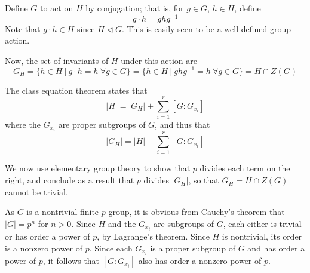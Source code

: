 \documentclass[12pt]{article}
\begin{document}
Define $G$ to act on $H$ by conjugation; that is, for $g\in G$, $h\in H$, define
\[g \cdot h = ghg^{-1}\]
Note that $g\cdot h\in H$ since $H\triangleleft G$. This is easily seen to be a well-defined group action.

Now, the set of invariants of $H$ under this action are
\[G_H=\{h \in H \  \lvert \  g \cdot h = h \  \forall g\in G\} = \{h \in H \  \lvert \  ghg^{-1} = h \  \forall g\in G\}=H \cap Z(G)\]

The class equation theorem states that
\[\lvert H\rvert = \lvert G_H\rvert + \sum_{i=1}^{r}[G:G_{x_{i}}]\]
where the $G_{x_{i}}$ are proper subgroups of $G$, and thus that
\[\lvert G_H\rvert = \lvert H\rvert - \sum_{i=1}^{r}[G:G_{x_{i}}]\]

We now use elementary group theory to show that $p$ divides each term on the right, and conclude as a result that $p$ divides $\lvert G_H\rvert$, so that $G_H=H\cap Z(G)$ cannot be trivial.

As $G$ is a nontrivial finite $p$-group, it is obvious from Cauchy's theorem that $|G|=p^{n}$ for $n>0$. Since $H$ and the $G_{x_i}$ are subgroups of $G$, each either is trivial or has order a power of $p$, by Lagrange's theorem. Since $H$ is nontrivial, its order is a nonzero power of $p$. Since each $G_{x_i}$ is a proper subgroup of $G$ and has order a power of $p$, it follows that $[G:G_{x_i}]$ also has order a nonzero power of $p$.
\end{document}
